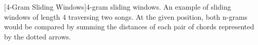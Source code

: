 [4-Gram Sliding Windows]4-gram sliding windows. An example of sliding windows of length 4 traversing two songs. At the given position, both n-grams would be compared by summing the distances of each pair of chords represented by the dotted arrows.